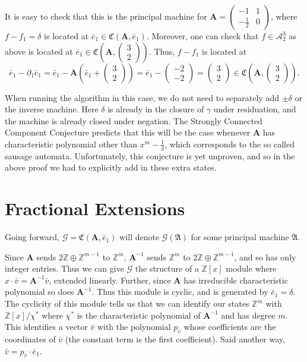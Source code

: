 \documentclass[final]{ws-ijac}
\newcommand{\A}{\mathcal{A}}
\newcommand{\G}{\mathcal{G}}
\renewcommand{\P}{\mathfrak{A}}
\newcommand{\Z}{\mathbb{Z}}
\newcommand{\2}{\textbf{2}}
\newcommand{\Am}{\textbf{A}}
\newcommand{\del}{\partial}
\newcommand{\vv}{\bar{v}}
\newcommand{\e}{\bar{e}}
\begin{document}
It is easy to check that this is the principal machine for
$\Am = \begin{pmatrix} -1 & 1 \\ -\frac{1}{2} & 0 \end{pmatrix}$,
where $f - f_1 = \delta$ is located at $\e_1 \in \mathfrak{C}(\Am, \e_1)$.
Moreover, one can check that $f \in \A^3_2$ as above is located at 
$\e_1 \in \mathfrak{C}\left ( \Am, \begin{pmatrix} 3 \\ 2 \end{pmatrix} \right )$.
Thus, $f - f_1$ is located at 
\[ 
  \e_1 - \del_1 \e_1 = 
  \e_1 - \Am \left ( \e_1 + \begin{pmatrix} 3 \\ 2 \end{pmatrix} \right ) = 
  \e_1 - \begin{pmatrix} -2 \\ -2 \end{pmatrix} =
  \begin{pmatrix} 3 \\ 2 \end{pmatrix} \in
  \mathfrak{C}\left ( \Am, \begin{pmatrix} 3 \\ 2 \end{pmatrix} \right ).
\]

When running the algorithm in this case, we do not need to separately add
$\pm \delta$ or the inverse machine. Here $\delta$ is already in the closure of
$\gamma$ under residuation, and the machine is already closed under negation. 
The Strongly Connected Component Conjecture 
predicts that this will be the case whenever $\Am$ has characteristic 
polynomial other than $x^m - \frac{1}{2}$, which corresponds to the so called 
sausage automata. Unfortunately, this conjecture is yet unproven,
and so in the above proof we had to explicitly add in these extra states.

\section{Fractional Extensions}
Going forward, $\G = \mathfrak{C}(\Am,\e_1)$ will denote $\G(\P)$ for some 
principal machine $\P$. 

Since $\Am$ sends $2\Z \oplus \Z^{m-1}$ to $\Z^m$, 
$\Am^{-1}$ sends $\Z^m$ to $2\Z \oplus \Z^{m-1}$, and so has 
only integer entries. Thus we can give $\G$ the structure of a 
$\Z[x]$ module where $x \cdot \vv = \Am^{-1}\vv$, extended linearly. Further, 
since $\Am$ has irreducible characteristic polynomial so does $\Am^{-1}$. Thus 
this module is cyclic, and is generated by $\e_1 = \delta$. The cyclicity of 
this module tells us that we can identify our states $\Z^m$ with $\Z[x] / \chi^*$ 
where $\chi^*$ is the characteristic polynomial of $\Am^{-1}$ and has degree 
$m$. This identifies a vector $\vv$ with the polynomial $p_{\vv}$ whose 
coefficients are the coordinates of $\vv$ (the constant term is the first 
coefficient). Said another way, $\vv = p_{\vv} \cdot \e_1$.
\end{document}
